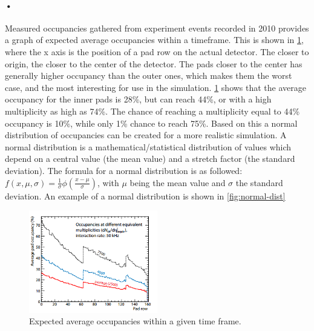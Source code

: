 \documentclass[a4paper, 12pt]{report}
\begin{document}
\paragraph{•}
Measured occupancies gathered from experiment events recorded in 2010 provides a graph of expected average occupancies within a timeframe.
This is shown in \ref{fig:expected-occupancy}, where the x axis is the position of a pad row on the actual detector.
The closer to origin, the closer to the center of the detector.
The pads closer to the center has generally higher occupancy than the outer ones, which makes them the worst case, and the most interesting for use in the simulation.
\ref{fig:expected-occupancy} shows that the average occupancy for the inner pads is 28\%, but can reach 44\%, or with a high multiplicity as high as 74\%.
The chance of reaching a multiplicity equal to 44\% occupancy is 10\%, while only 1\% chance to reach 75\%.
Based on this a normal distribution of occupancies can be created for a more realistic simulation.
A normal distribution is a mathematical/statistical distribution of values which depend on a central value (the mean value) and a stretch factor (the standard deviation)\cite{normal-dist}.
The formula for a normal distribution is as followed: $f(x,\mu,\sigma) = \frac{1}{\sigma}\phi(\frac{x-\mu}{\sigma})  $, with $ \mu$ being the mean value and $ \sigma$ the standard deviation. 
An example of a normal distribution is shown in \ref{fig:normal-dist}

\begin{figure}[h!]
	\centering
		\includegraphics[width=0.5\textwidth]{images/expected-occupancy.png}
		\caption[Expected average occupancies within a given time frame.]{Expected average occupancies within a given time frame. \cite{tdr-016}}
		\label{fig:expected-occupancy}
\end{figure}
\end{document}
